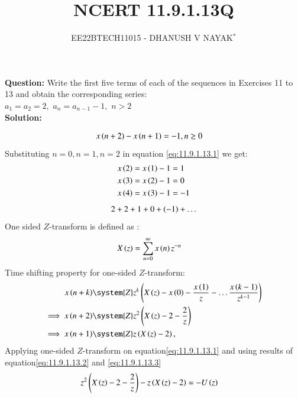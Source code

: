 \documentclass[journal,12pt,twocolumn]{IEEEtran}
\theoremstyle{remark}
\begin{document}

\title{NCERT 11.9.1.13Q}
\author{EE22BTECH11015 - DHANUSH V NAYAK$^{*}$%
}
\maketitle
\newpage
\bigskip
\renewcommand{\thefigure}{\arabic{figure}}
\renewcommand{\thetable}{\theenumi}
\textbf{Question:} Write the first five terms of each of the sequences in Exercises 11 to 13 and obtain the corresponding series:\\
$a_1=a_2=2,$\hspace{5pt} $a_n=a_{n-1} -1,$\hspace{5pt} $n>2$\\
\textbf{Solution:}

\begin{align}
    x\left(n+2\right) - x\left(n+1\right) &= -1 , n\geq 0 \label{eq:11.9.1.13.1}
\end{align}
Substituting $n=0 , n=1 , n=2$ in equation \eqref{eq:11.9.1.13.1} we get:
\begin{align}
    x\left(2\right) &= x\left(1\right) - 1 = 1  \\
    x\left(3\right) &= x\left(2\right) - 1 = 0\\
    x\left(4\right) &= x\left(3\right) - 1 = -1 
\end{align}
\begin{align}
2 + 2 + 1 + 0 + (-1) + \dots \notag
\end{align}
One sided $Z$-transform is defined as :
\begin{align}
    X\left(z\right) &= \sum_{n=0}^\infty x\left(n\right) z^{-n}
\end{align}
Time shifting property for one-sided $Z$-transform:
\begin{align}
	x\brak{n+k}&\system{Z} z^{k}\brak{X\brak{z}-x\brak{0}-\frac{x\brak{1}}{z}-\ldots \frac{x\brak{k-1}}{z^{k-1}}}\label{eq:one-sided-shiftk}\\
\implies x\brak{n+2} &\system{Z} z^{2}\brak{X\brak{z}-2-\frac{2}{z}} \label{eq:11.9.1.13.2} \\
\implies x\brak{n+1} &\system{Z} z\brak{X\brak{z}-2}, \label{eq:11.9.1.13.3}
\end{align}
Applying one-sided $Z$-transform on equation\eqref{eq:11.9.1.13.1} and using results of equation\eqref{eq:11.9.1.13.2} and \eqref{eq:11.9.1.13.3}
\begin{align}
    z^{2}\left(X\left(z\right)-2-\frac{2}{z}\right) - z\left(X\left(z\right)-2\right) &= -U\left(z\right)
\end{align}
\end{document}
